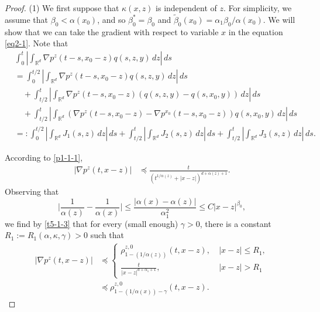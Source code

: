 \documentclass[a4paper,11pt]{amsart}
\renewcommand{\le}{\leqslant}
\newcommand{\R}{\mathds R}
\newcommand{\B}{\beta}
\newcommand{\p}{\preceq}
\newcommand{\K}{\kappa}
\newcommand{\A}{\alpha}
\newcommand{\G}{\gamma}
\theoremstyle{definition}
\begin{document}
\begin{proof}


(1) We first suppose that $\K(x,z)$ is independent of $z$. For simplicity, we assume
that $\B_0< \A(x_0)$, and so $\B_0^*=\B_0$ and
$\tilde \B_0(x_0)={\A_1\B_0}/{\A(x_0)}$. We will show that we can take the gradient with respect to variable $x$ in the equation \eqref{eq2-1}.
Note that
\begin{align*}
&\int_0^t \left|\int_{\R^d}\nabla p^z(t-s,x_0-z)q(s,z,y)\,dz\right|\,ds\\
&=\int_0^{t/2}\left|\int_{\R^d}\nabla p^z(t-s,x_0-z)q(s,z,y)\,dz\right|\,ds\\
&\quad+\int_{t/2}^t\left|\int_{\R^d}\nabla p^z(t-s,x_0-z)\left(q(s,z,y)-q(s,x_0,y)\right)\,dz\right|\,ds\\
&\quad+\int_{t/2}^t\left|\int_{\R^d}\left(\nabla p^z(t-s,x_0-z)-\nabla p^{x_0}(t-s,x_0-z)\right)
q(s,x_0,y)\,dz\right|\,ds\\
&=:\int_0^{t/2}\left|\int_{\R^d}J_1(s,z)\,dz\right|\,ds+\int_{t/2}^t
\left|\int_{\R^d}J_2(s,z)\,dz\right|\,ds+\int_{t/2}^t
\left|\int_{\R^d}J_3(s,z)\,dz\right|\,ds.
\end{align*}



According to \eqref{p1-1-1},
\begin{equation}\label{t5-1-3}
\begin{split}
|\nabla p^z(t,x-z)|&\p \frac{t}{(t^{{1}/{\A(z)}}+|x-z|)^{d+\A(z)+1}}.
\end{split}
\end{equation}
Observing that
\begin{equation*}
\Big|\frac{1}{\A(z)}-\frac{1}{\A(x)}\Big|\le
\frac{|\A(x)-\A(z)|}{\A_1^2}\le C|x-z|^{\B_0},
\end{equation*}
we find by \eqref{t5-1-3} that for every (small enough) $\G>0$, there is a constant $R_1:=R_1(\A, \K,\G)>0$ such that
\begin{equation}\label{t5-1-4}\begin{split}
|\nabla p^z(t,x-z)|&\p
\begin{cases}
\rho^{z,0}_{1-({1}/{\A(z)})}(t,x-z),\ &|x-z|\le R_1,\\
\frac{t}{|x-z|^{d+\A_1+1}}
,\ & |x-z|>R_1
\end{cases}\\
&\p \rho^{z,0}_{1-({1/\A(x)})-\G}(t,x-z). \end{split}
\end{equation}


\end{proof}
\end{document}

